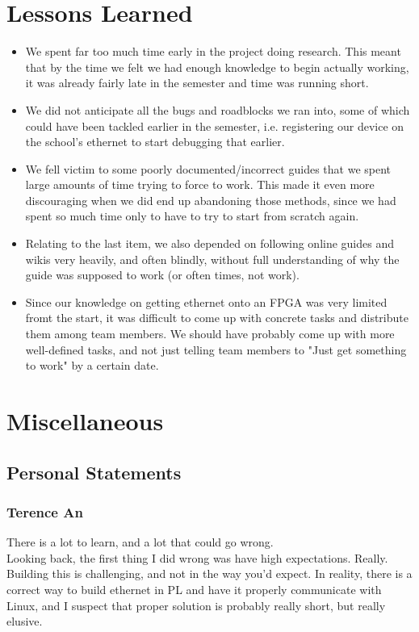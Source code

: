 \documentclass[12pt]{report}
\begin{document}
\chapter{Lessons Learned}
\begin{itemize}
\item We spent far too much time early in the project doing research. This meant that by the time we felt we had enough knowledge to begin actually working, it was already fairly late in the semester and time was running short.
\item We did not anticipate all the bugs and roadblocks we ran into, some of which could have been tackled earlier in the semester, i.e. registering our device on the school's ethernet to start debugging that earlier.
\item We fell victim to some poorly documented/incorrect guides that we spent large amounts of time trying to force to work. This made it even more discouraging when we did end up abandoning those methods, since we had spent so much time only to have to try to start from scratch again.
\item Relating to the last item, we also depended on following online guides and wikis very heavily, and often blindly, without full understanding of why the guide was supposed to work (or often times, not work).
\item Since our knowledge on getting ethernet onto an FPGA was very limited fromt the start, it was difficult to come up with concrete tasks and distribute them among team members. We should have probably come up with more well-defined tasks, and not just telling team members to "Just get something to work" by a certain date.
\end{itemize}


\chapter{Miscellaneous}
\section{Personal Statements}
\subsection{Terence An}
There is a lot to learn, and a lot that could go wrong. \\
Looking back, the first thing I did wrong was have high expectations. Really. \\
Building this is challenging, and not in the way you'd expect. In reality, there is a correct way to build ethernet in PL and have it properly communicate with Linux, and I suspect that proper solution is probably really short, but really elusive.
\end{document}
